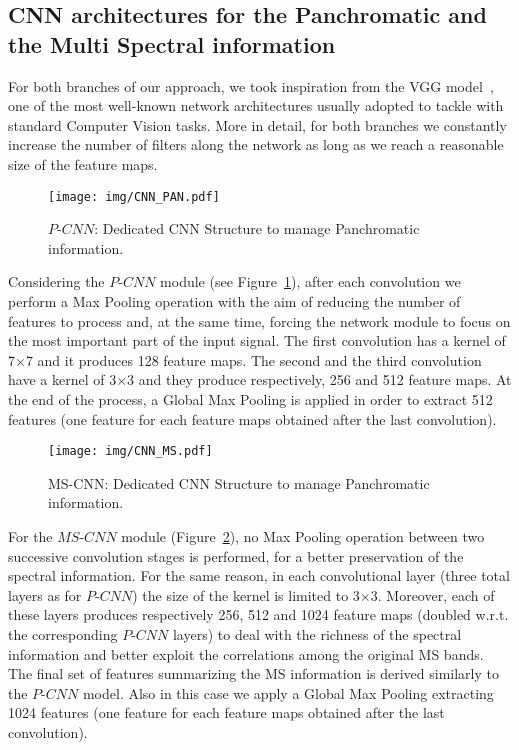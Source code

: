 \documentclass[journal]{IEEEtran}
\begin{document}
\subsection{CNN architectures for the Panchromatic and the Multi Spectral information}

For both branches of our approach, we took inspiration from the VGG model~\cite{SimonyanZ14a}, one of the most well-known network architectures usually adopted to tackle with standard Computer Vision tasks. More in detail, for both branches we constantly increase the number of filters along the network as long as we reach a reasonable size of the feature maps.

\begin{figure}[ht!]
\centering
\texttt{[image: img/CNN\_PAN.pdf]}
\caption{ \label{fig:CNNPAN} $P$-$CNN$: Dedicated CNN Structure to manage Panchromatic information.}
\end{figure}Considering the $P$-$CNN$ module (see Figure~\ref{fig:CNNPAN}), after each convolution we perform a Max Pooling operation with the aim of reducing the number of features to process and, at the same time, forcing the network module to focus on the most important part of the input signal. The first convolution has a kernel of 7$\times$7 and it produces 128 feature maps. The second and the third convolution have a kernel of 3$\times$3 and they produce respectively, 256 and 512 feature maps. At the end of the process, a Global Max Pooling is applied in order to extract 512 features (one feature for each feature maps obtained after the last convolution).

\begin{figure}[ht!]
\centering
\texttt{[image: img/CNN\_MS.pdf]}
\caption{ \label{fig:CNNMS} MS-CNN: Dedicated CNN Structure to manage  Panchromatic information.  }
\end{figure}

For the $MS$-$CNN$ module (Figure~\ref{fig:CNNMS}), no Max Pooling operation between two successive convolution stages is performed, for a better preservation of the spectral information. For the same reason, in each convolutional layer (three total layers as for $P$-$CNN$) the size of the kernel is limited to 3$\times$3. Moreover, each of these layers produces respectively 256, 512 and 1024 feature maps (doubled w.r.t. the corresponding $P$-$CNN$ layers) to deal with the richness of the spectral information and better exploit the correlations among the original MS bands. The final set of features summarizing the MS information is derived similarly to the $P$-$CNN$ model. Also in this case we apply a Global Max Pooling extracting 1024 features (one feature for each feature maps obtained after the last convolution).
\end{document}
